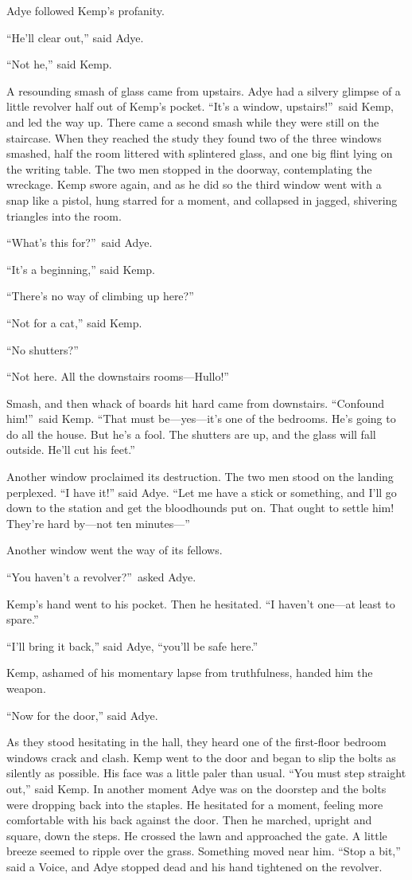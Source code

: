 Adye followed Kemp’s profanity.

“He’ll clear out,” said Adye.

“Not he,” said Kemp.

A resounding smash of glass came from upstairs. Adye had a silvery glimpse of a little revolver half out of Kemp’s pocket. “It’s a window, upstairs!”\ said Kemp, and led the way up. There came a second smash while they were still on the staircase. When they reached the study they found two of the three windows smashed, half the room littered with splintered glass, and one big flint lying on the writing table. The two men stopped in the doorway, contemplating the wreckage. Kemp swore again, and as he did so the third window went with a snap like a pistol, hung starred for a moment, and collapsed in jagged, shivering triangles into the room.

“What’s this for?”\ said Adye.

“It’s a beginning,” said Kemp.

“There’s no way of climbing up here?”

“Not for a cat,” said Kemp.

“No shutters?”

“Not here. All the downstairs rooms—Hullo!”

Smash, and then whack of boards hit hard came from downstairs. “Confound him!”\ said Kemp. “That must be—yes—it’s one of the bedrooms. He’s going to do all the house. But he’s a fool. The shutters are up, and the glass will fall outside. He’ll cut his feet.”

Another window proclaimed its destruction. The two men stood on the landing perplexed. “I have it!” said Adye. “Let me have a stick or something, and I’ll go down to the station and get the bloodhounds put on. That ought to settle him! They’re hard by—not ten minutes—”

Another window went the way of its fellows.

“You haven’t a revolver?”\ asked Adye.

Kemp’s hand went to his pocket. Then he hesitated. “I haven’t one—at least to spare.”

“I’ll bring it back,” said Adye, “you’ll be safe here.”

Kemp, ashamed of his momentary lapse from truthfulness, handed him the weapon.

“Now for the door,” said Adye.

As they stood hesitating in the hall, they heard one of the first-floor bedroom windows crack and clash. Kemp went to the door and began to slip the bolts as silently as possible. His face was a little paler than usual. “You must step straight out,” said Kemp. In another moment Adye was on the doorstep and the bolts were dropping back into the staples. He hesitated for a moment, feeling more comfortable with his back against the door. Then he marched, upright and square, down the steps. He crossed the lawn and approached the gate. A little breeze seemed to ripple over the grass. Something moved near him. “Stop a bit,” said a Voice, and Adye stopped dead and his hand tightened on the revolver.

